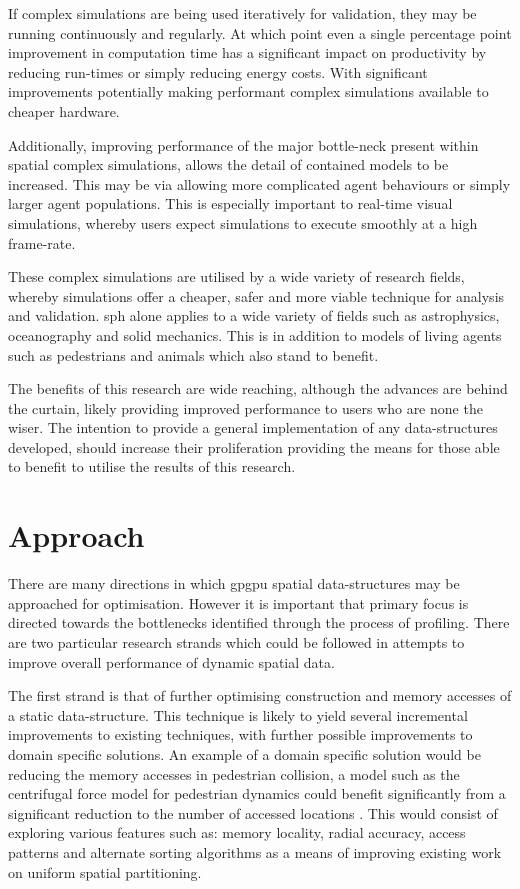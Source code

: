     If complex simulations are being used iteratively for validation, they may be running continuously and regularly. At which point even a single percentage point improvement in computation time has a significant impact on productivity by reducing run-times or simply reducing energy costs. With significant improvements potentially making performant complex simulations available to cheaper hardware.
     
    Additionally, improving performance of the major bottle-neck present within spatial complex simulations, allows the detail of contained models to be increased. This may be via allowing more complicated agent behaviours or simply larger agent populations. This is especially important to real-time visual simulations, whereby users expect simulations to execute smoothly at a high frame-rate.
     
    These complex simulations are utilised by a wide variety of research fields, whereby simulations offer a cheaper, safer and more viable technique for analysis and validation. \gls{sph} alone applies to a wide variety of fields such as astrophysics, oceanography and solid mechanics. This is in addition to models of living agents such as pedestrians and animals which also stand to benefit. 
    
    The benefits of this research are wide reaching, although the advances are behind the curtain, likely providing improved performance to users who are none the wiser. The intention to provide a general implementation of any data-structures developed, should increase their proliferation providing the means for those able to benefit to utilise the results of this research.
     
  \section{Approach}
    There are many directions in which \gls{gpgpu} spatial data-structures may be approached for optimisation. However it is important that primary focus is directed towards the bottlenecks identified through the process of profiling. There are two particular research strands which could be followed in attempts to improve overall performance of dynamic spatial data. 
    
    The first strand is that of further optimising construction and memory accesses of a static data-structure. This technique is likely to yield several incremental improvements to existing techniques, with further possible improvements to domain specific solutions. An example of a domain specific solution would be reducing the memory accesses in pedestrian collision, a model such as the centrifugal force model for pedestrian dynamics could benefit significantly from a significant reduction to the number of accessed locations \cite{YC*05}. This would consist of exploring various features such as: memory locality, radial accuracy, access patterns and alternate sorting algorithms as a means of improving existing work on uniform spatial partitioning.
    
